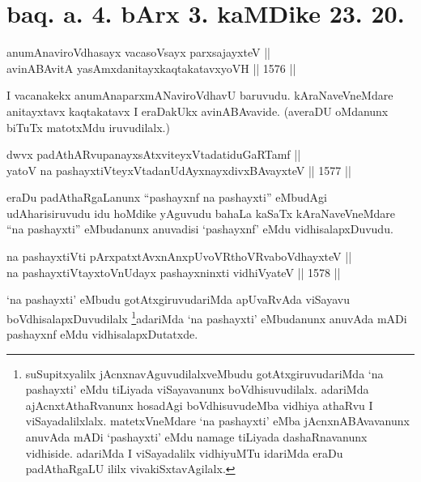 \section*{baq. a. 4. bArx 3. kaMDike 23. 20.}

\begin{shl}
anumAnaviroVdhasayx vacasoV\s sayx parxsajayxteV || \\
avinABAvitA yasAmxdanitayxkaqtakatavxyoVH \hfill || 1576 || 
\end{shl}

\begin{artha}
I vacanakekx anumAnaparxmANaviroVdhavU baruvudu. kAraNaveVneMdare anitayxtavx kaqtakatavx I eraDakUkx avinABAvavide. (averaDU oMdanunx biTuTx matotxMdu iruvudilalx.)
\end{artha}


\begin{shl}
dwvx padAthARvupanayxsAtxviteyxVtadatiduGaRTamf || \\
yatoV na pashayxtiVteyxVtadanUdAyxnayxdivxBAvayxteV \hfill || 1577 ||  
\end{shl}

\begin{artha}
eraDu padAthaRgaLanunx ``pashayxnf na pashayxti'' eMbudAgi udAharisiruvudu idu hoMdike yAguvudu bahaLa kaSaTx kAraNaveVneMdare ``na pashayxti'' eMbudanunx anuvadisi `pashayxnf' eMdu vidhisalapxDuvudu.
\end{artha}


\begin{shl}
na pashayxtiVti pArxpatxtAvxnAnxpUvoVR\s thoVR\s vaboVdhayxteV ||  \\
na pashayxtiVtayxtoV\s nUdayx pashayxninxti vidhiVyateV \hfill || 1578 ||  
\end{shl}

\begin{artha}
`na pashayxti' eMbudu gotAtxgiruvudariMda apUvaRvAda viSayavu boVdhisalapxDuvudilalx \footnote{suSupitxyalilx jAcnxnavAguvudilalxveMbudu gotAtxgiruvudariMda `na pashayxti' eMdu tiLiyada viSayavanunx boVdhisuvudilalx. adariMda ajAcnxtAthaRvanunx hosadAgi boVdhisuvudeMba vidhiya athaRvu I viSayadalilxlalx. matetxVneMdare `na pashayxti' eMba jAcnxnABAvavanunx anuvAda mADi `pashayxti' eMdu namage tiLiyada dashaRnavanunx vidhiside. adariMda I viSayadalilx vidhiyuMTu idariMda eraDu padAthaRgaLU ililx vivakiSxtavAgilalx.}adariMda `na pashayxti' eMbudanunx anuvAda mADi pashayxnf eMdu vidhisalapxDutatxde.
\end{artha}

